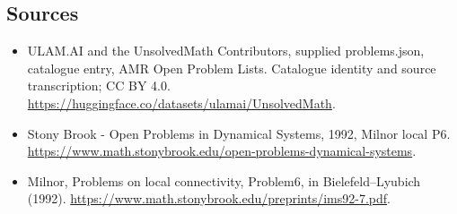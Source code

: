 \documentclass[11pt,a4paper]{article}
\begin{document}
\subsection{Sources}
\begin{itemize}
\item[S1] ULAM.AI and the UnsolvedMath Contributors, supplied problems.json, catalogue entry, AMR Open Problem Lists. Catalogue identity and source transcription; CC BY 4.0.
\url{https://huggingface.co/datasets/ulamai/UnsolvedMath}.
\item[S2] Stony Brook - Open Problems in Dynamical Systems, 1992, Milnor local P6. 
\url{https://www.math.stonybrook.edu/open-problems-dynamical-systems}.
\item[S3] Milnor, Problems on local connectivity, Problem6, in Bielefeld–Lyubich (1992).
\url{https://www.math.stonybrook.edu/preprints/ims92-7.pdf}.
\end{itemize}
\end{document}
